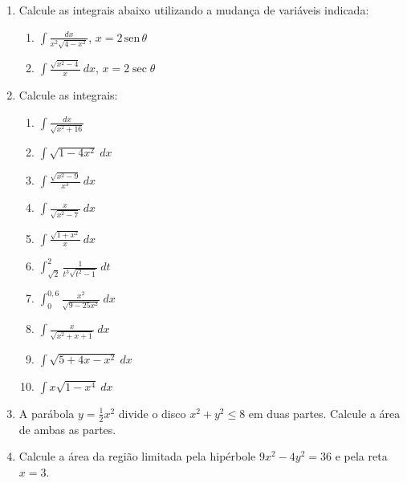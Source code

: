 \documentclass[a4paper,5pt]{amsbook}
\newcommand{\sen}{\,\mbox{sen}\,}
\newcommand{\ds}{\displaystyle}
\begin{document}
\vspace{1cm}
\begin{enumerate}
	\vspace{0.5cm}
    \item Calcule as integrais abaixo utilizando a mudan\c{c}a de vari\'aveis indicada:
        \begin{enumerate}
            \item $\ds\int\frac{dx}{x^2\sqrt{4-x^2}}$, $x=2\sen{\theta}$
            \vspace{0.2cm}
            \item $\ds\int\frac{\sqrt{x^2-4}}{x}\ dx$, $x=2\sec{\theta}$
        \end{enumerate}

	\vspace{0.5cm}
    \item Calcule as integrais:
        \begin{enumerate}
            \item $\ds\int\frac{dx}{\sqrt{x^2+16}}$
            \vspace{0.2cm}
            \item $\ds\int\sqrt{1-4x^2}\ dx$
            \vspace{0.2cm}
            \item $\ds\int\frac{\sqrt{x^2-9}}{x^3}\ dx$
            \vspace{0.2cm}
            \item $\ds\int\frac{x}{\sqrt{x^2-7}}\ dx$
            \vspace{0.2cm}
            \item $\ds\int\frac{\sqrt{1+x^2}}{x}\ dx$
            \vspace{0.2cm}
            \item $\ds\int_{\sqrt{2}}^{2}\frac{1}{t^3\sqrt{t^2-1}}\ dt$
            \vspace{0.2cm}
            \item $\ds\int_0^{0,6}\frac{x^2}{\sqrt{9-25x^2}}\ dx$
            \vspace{0.2cm}
            \item $\ds\int\frac{x}{\sqrt{x^2+x+1}}\ dx$
            \vspace{0.2cm}
            \item $\ds\int\sqrt{5+4x-x^2}\ dx$
            \vspace{0.2cm}
            \item $\ds\int x\sqrt{1-x^4}\ dx$
        \end{enumerate}

    \vspace{0.5cm}
    \item A par\'abola $y=\frac{1}{2}x^2$ divide o disco $x^2+y^2\le 8$ em duas
        partes. Calcule a \'area de ambas as partes.

    \vspace{0.5cm}
    \item Calcule a \'area da regi\~ao limitada pela hip\'erbole $9x^2-4y^2=36$ e
        pela reta $x=3$.
\end{enumerate}
\end{document}
